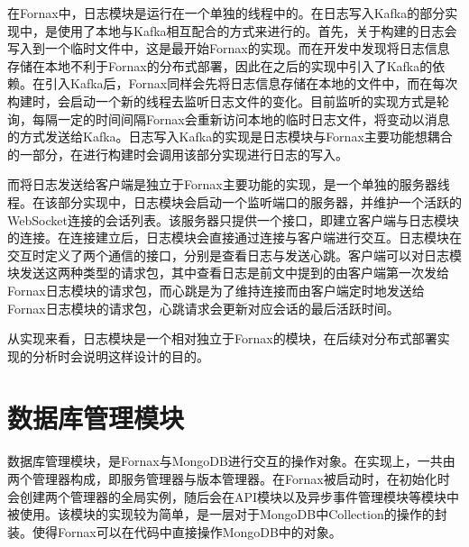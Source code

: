 在Fornax中，日志模块是运行在一个单独的线程中的。在日志写入Kafka的部分实现中，是使用了本地与Kafka相互配合的方式来进行的。首先，关于构建的日志会写入到一个临时文件中，这是最开始Fornax的实现。而在开发中发现将日志信息存储在本地不利于Fornax的分布式部署，因此在之后的实现中引入了Kafka的依赖。在引入Kafka后，Fornax同样会先将日志信息存储在本地的文件中，而在每次构建时，会启动一个新的线程去监听日志文件的变化。目前监听的实现方式是轮询，每隔一定的时间间隔Fornax会重新访问本地的临时日志文件，将变动以消息的方式发送给Kafka。日志写入Kafka的实现是日志模块与Fornax主要功能想耦合的一部分，在进行构建时会调用该部分实现进行日志的写入。

而将日志发送给客户端是独立于Fornax主要功能的实现，是一个单独的服务器线程。在该部分实现中，日志模块会启动一个监听端口的服务器，并维护一个活跃的WebSocket连接的会话列表。该服务器只提供一个接口，即建立客户端与日志模块的连接。在连接建立后，日志模块会直接通过连接与客户端进行交互。日志模块在交互时定义了两个通信的接口，分别是查看日志与发送心跳。客户端可以对日志模块发送这两种类型的请求包，其中查看日志是前文中提到的由客户端第一次发给Fornax日志模块的请求包，而心跳是为了维持连接而由客户端定时地发送给Fornax日志模块的请求包，心跳请求会更新对应会话的最后活跃时间。

从实现来看，日志模块是一个相对独立于Fornax的模块，在后续对分布式部署实现的分析时会说明这样设计的目的。

\section{数据库管理模块}

数据库管理模块，是Fornax与MongoDB进行交互的操作对象。在实现上，一共由两个管理器构成，即服务管理器与版本管理器。在Fornax被启动时，在初始化时会创建两个管理器的全局实例，随后会在API模块以及异步事件管理模块等模块中被使用。该模块的实现较为简单，是一层对于MongoDB中Collection的操作的封装。使得Fornax可以在代码中直接操作MongoDB中的对象。

